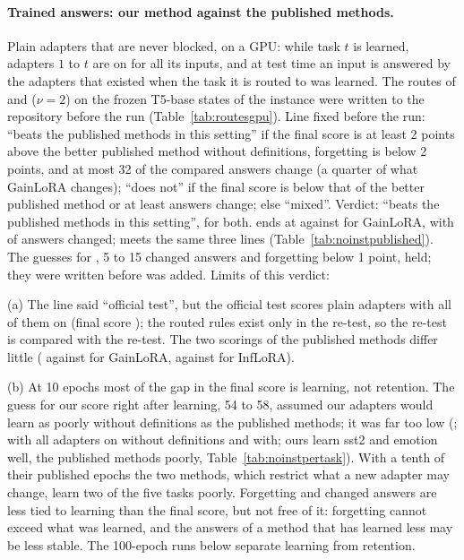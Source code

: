 \paragraph{Trained answers: our method against the published methods.} Plain adapters that are never blocked, on a GPU: while task $t$ is learned, adapters $1$ to $t$ are on for all its inputs, and at test time an input is answered by the adapters that existed when the task it is routed to was learned. The routes of \recog{} and \handicap{} ($\nu = 2$) on the frozen T5-base states of the instance were written to the repository before the run (Table~\ref{tab:routesgpu}).
Line fixed before the run: ``beats the published methods in this setting'' if the final score is at least 2 points above the better published method without definitions, forgetting is below 2 points, and at most 32 of the \AudOursRidgeCompared{} compared answers change (a quarter of what GainLoRA changes); ``does not'' if the final score is below that of the better published method or at least \AudPubGainloraNoDefChanged{} answers change; else ``mixed''. Verdict: ``beats the published methods in this setting'', for both. \recog{} ends at \AudOursRidgeAP{} against \AudPubGainloraNoDefAP{} for GainLoRA, with \AudOursRidgeChanged{} of \AudOursRidgeCompared{} answers changed; \handicap{} meets the same three lines (Table~\ref{tab:noinstpublished}). The guesses for \recog{}, 5 to 15 changed answers and forgetting below 1 point, held; they were written before \handicap{} was added.
Limits of this verdict:

(a) The line said ``official test'', but the official test scores plain adapters with all of them on (final score \AudOffOursNoDefAP{}); the routed rules exist only in the re-test, so the re-test is compared with the re-test. The two scorings of the published methods differ little (\AudPubGainloraNoDefAP{} against \AudOffGainloraNoDefAP{} for GainLoRA, \AudPubInfloraNoDefAP{} against \AudOffInfloraNoDefAP{} for InfLoRA).

(b) At 10 epochs most of the gap in the final score is learning, not retention. The guess for our score right after learning, 54 to 58, assumed our adapters would learn as poorly without definitions as the published methods; it was far too low (\AudOursRidgeLearned{}; with all adapters on \AudOursAllLearned{} without definitions and \AudWordOriginalAllLearned{} with; ours learn sst2 and emotion well, the published methods poorly, Table~\ref{tab:noinstpertask}). With a tenth of their published epochs the two methods, which restrict what a new adapter may change, learn two of the five tasks poorly. Forgetting and changed answers are less tied to learning than the final score, but not free of it: forgetting cannot exceed what was learned, and the answers of a method that has learned less may be less stable. The 100-epoch runs below separate learning from retention.


